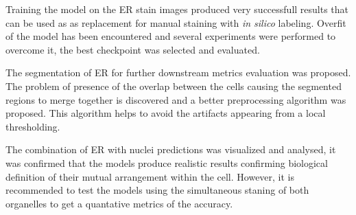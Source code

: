 Training the model on the ER stain images produced very successfull results that can be used as as replacement for manual staining with \textit{in silico} labeling. Overfit of the model has been encountered and several experiments were performed to overcome it, the best checkpoint was selected and evaluated.

The segmentation of ER for further downstream metrics evaluation was proposed. The problem of presence of the overlap between the cells causing the segmented regions to merge together is discovered and a better preprocessing algorithm was proposed. This algorithm helps to avoid the artifacts appearing from a local thresholding.

The combination of ER with nuclei predictions was visualized and analysed, it was confirmed that the models produce realistic results confirming biological definition of their mutual arrangement within the cell. However, it is recommended to test the models using the simultaneous staning of both organelles to get a quantative metrics of the accuracy.